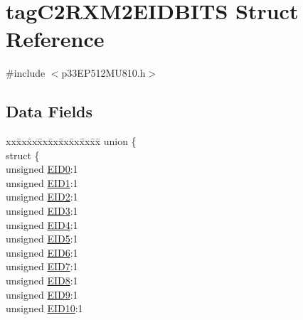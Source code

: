 \hypertarget{structtag_c2_r_x_m2_e_i_d_b_i_t_s}{}\section{tag\+C2\+R\+X\+M2\+E\+I\+D\+B\+I\+TS Struct Reference}
\label{structtag_c2_r_x_m2_e_i_d_b_i_t_s}


{\ttfamily \#include $<$p33\+E\+P512\+M\+U810.\+h$>$}

\subsection*{Data Fields}
\begin{DoxyCompactItemize}
\item 
\begin{tabbing}
xx\=xx\=xx\=xx\=xx\=xx\=xx\=xx\=xx\=\kill
union \{\\
\>struct \{\\
\>\>unsigned \hyperlink{structtag_c2_r_x_m2_e_i_d_b_i_t_s_a9da8b7b30247e4f9cd8cc056549aa9fd}{EID0}:1\\
\>\>unsigned \hyperlink{structtag_c2_r_x_m2_e_i_d_b_i_t_s_afd6c139491d147c1262f3d051c6691e9}{EID1}:1\\
\>\>unsigned \hyperlink{structtag_c2_r_x_m2_e_i_d_b_i_t_s_a36ec62d8d3c5acd5d15e6691dc099a94}{EID2}:1\\
\>\>unsigned \hyperlink{structtag_c2_r_x_m2_e_i_d_b_i_t_s_ab895f7d0ac289a0383b607cbc62eebe2}{EID3}:1\\
\>\>unsigned \hyperlink{structtag_c2_r_x_m2_e_i_d_b_i_t_s_a136d5a709d6618d40acceccb43036656}{EID4}:1\\
\>\>unsigned \hyperlink{structtag_c2_r_x_m2_e_i_d_b_i_t_s_a8dffb2d86a6c184df505ae7c71a58710}{EID5}:1\\
\>\>unsigned \hyperlink{structtag_c2_r_x_m2_e_i_d_b_i_t_s_af8a8574102515d8f1a4b7fd1685d0532}{EID6}:1\\
\>\>unsigned \hyperlink{structtag_c2_r_x_m2_e_i_d_b_i_t_s_a84c3262e67f8d5fd387ac10bde6fa9b1}{EID7}:1\\
\>\>unsigned \hyperlink{structtag_c2_r_x_m2_e_i_d_b_i_t_s_acca25e0b7d86eb499d01f85222baea87}{EID8}:1\\
\>\>unsigned \hyperlink{structtag_c2_r_x_m2_e_i_d_b_i_t_s_ac6748f73d4ada8538b06548be4f396c2}{EID9}:1\\
\>\>unsigned \hyperlink{structtag_c2_r_x_m2_e_i_d_b_i_t_s_a9cea8e77ecbb72bd3b08102412793725}{EID10}:1\\

\end{tabbing}
\end{DoxyCompactItemize}
